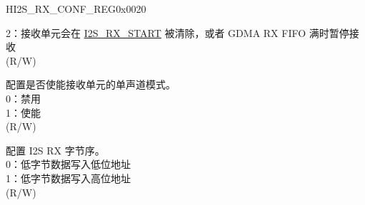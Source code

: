 \begin{register}{H}{I2S\_RX\_CONF\_REG}{0x0020}
\begin{regdesc}
\begin{reglist}
2：接收单元会在 \hyperref[fielddesc:I2SRXSTART]{I2S\_RX\_START} 被清除，或者 GDMA RX FIFO 满时暂停接收\\
(R/W)
\label{fielddesc:I2SRXMONO}\item [I2S\_RX\_MONO] 配置是否使能接收单元的单声道模式。 \\
0：禁用\\
1：使能\\
(R/W)
\label{fielddesc:I2SRXBIGENDIAN}\item [I2S\_RX\_BIG\_ENDIAN] 配置 I2S RX 字节序。 \\
0：低字节数据写入低位地址\\
1：低字节数据写入高位地址\\
(R/W)

\item [见下页...]
\end{reglist}\end{regdesc}
\end{register}
\addtocounter{Regfloat}{-1}
